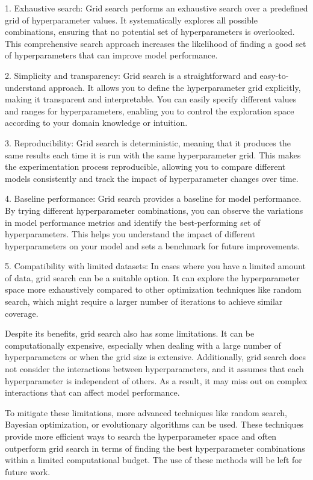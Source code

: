 \documentclass[a4paper]{article}
\begin{document}
1. Exhaustive search: Grid search performs an exhaustive search over a predefined grid of hyperparameter values. It systematically explores all possible combinations, ensuring that no potential set of hyperparameters is overlooked. This comprehensive search approach increases the likelihood of finding a good set of hyperparameters that can improve model performance.

2. Simplicity and transparency: Grid search is a straightforward and easy-to-understand approach. It allows you to define the hyperparameter grid explicitly, making it transparent and interpretable. You can easily specify different values and ranges for hyperparameters, enabling you to control the exploration space according to your domain knowledge or intuition.

3. Reproducibility: Grid search is deterministic, meaning that it produces the same results each time it is run with the same hyperparameter grid. This makes the experimentation process reproducible, allowing you to compare different models consistently and track the impact of hyperparameter changes over time.

4. Baseline performance: Grid search provides a baseline for model performance. By trying different hyperparameter combinations, you can observe the variations in model performance metrics and identify the best-performing set of hyperparameters. This helps you understand the impact of different hyperparameters on your model and sets a benchmark for future improvements.

5. Compatibility with limited datasets: In cases where you have a limited amount of data, grid search can be a suitable option. It can explore the hyperparameter space more exhaustively compared to other optimization techniques like random search, which might require a larger number of iterations to achieve similar coverage.

Despite its benefits, grid search also has some limitations. It can be computationally expensive, especially when dealing with a large number of hyperparameters or when the grid size is extensive. Additionally, grid search does not consider the interactions between hyperparameters, and it assumes that each hyperparameter is independent of others. As a result, it may miss out on complex interactions that can affect model performance.

To mitigate these limitations, more advanced techniques like random search, Bayesian optimization, or evolutionary algorithms can be used. These techniques provide more efficient ways to search the hyperparameter space and often outperform grid search in terms of finding the best hyperparameter combinations within a limited computational budget. The use of these methods will be left for future work.
\end{document}
